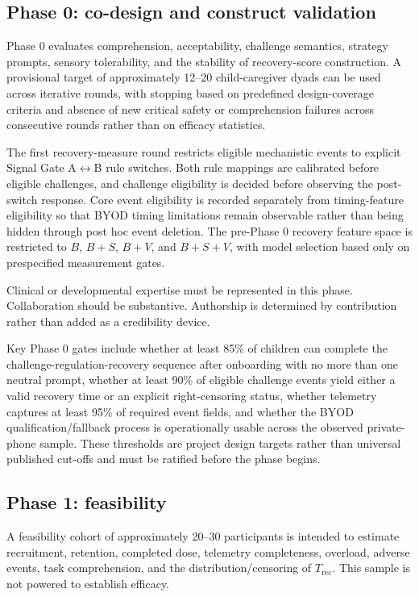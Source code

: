 \subsection{Phase 0: co-design and construct validation}

Phase 0 evaluates comprehension, acceptability, challenge semantics, strategy prompts, sensory tolerability, and the stability of recovery-score construction. A provisional target of approximately 12--20 child-caregiver dyads can be used across iterative rounds, with stopping based on predefined design-coverage criteria and absence of new critical safety or comprehension failures across consecutive rounds rather than on efficacy statistics.

The first recovery-measure round restricts eligible mechanistic events to explicit Signal Gate A\(\leftrightarrow\)B rule switches. Both rule mappings are calibrated before eligible challenges, and challenge eligibility is decided before observing the post-switch response. Core event eligibility is recorded separately from timing-feature eligibility so that BYOD timing limitations remain observable rather than being hidden through post hoc event deletion. The pre-Phase 0 recovery feature space is restricted to \(B\), \(B+S\), \(B+V\), and \(B+S+V\), with model selection based only on prespecified measurement gates.

Clinical or developmental expertise must be represented in this phase. Collaboration should be substantive. Authorship is determined by contribution rather than added as a credibility device.

Key Phase 0 gates include whether at least 85\% of children can complete the challenge-regulation-recovery sequence after onboarding with no more than one neutral prompt, whether at least 90\% of eligible challenge events yield either a valid recovery time or an explicit right-censoring status, whether telemetry captures at least 95\% of required event fields, and whether the BYOD qualification/fallback process is operationally usable across the observed private-phone sample. These thresholds are project design targets rather than universal published cut-offs and must be ratified before the phase begins.

\subsection{Phase 1: feasibility}

A feasibility cohort of approximately 20--30 participants is intended to estimate recruitment, retention, completed dose, telemetry completeness, overload, adverse events, task comprehension, and the distribution/censoring of \(T_{\mathrm{rec}}\). This sample is not powered to establish efficacy.

